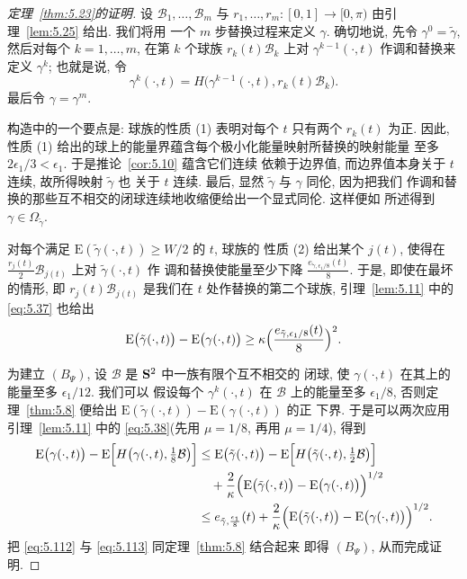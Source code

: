 \begin{proof}[定理~\ref{thm:5.23}的证明]
设 $\mathcal{B}_1,\dots,\mathcal{B}_m$ 与
$r_1,\dots,r_m:[0,1]\to[0,\pi)$ 由引理~\ref{lem:5.25} 给出. 我们将用
一个 $m$ 步替换过程来定义 $\gamma$. 确切地说, 先令
$\gamma^0=\tilde{\gamma}$, 然后对每个 $k=1,\dots,m$, 在第 $k$ 个球族
$r_k(t)\mathcal{B}_k$ 上对 $\gamma^{k-1}(\cdot,t)$ 作调和替换来定义
$\gamma^k$; 也就是说, 令
\begin{equation}
\gamma^k(\cdot,t)=H\bigl(\gamma^{k-1}(\cdot,t),r_k(t)\mathcal{B}_k\bigr).
\label{eq:5.111}
\end{equation}
最后令 $\gamma=\gamma^m$.

构造中的一个要点是: 球族的性质 (1) 表明对每个 $t$ 只有两个 $r_k(t)$ 为正.
因此, 性质 (1) 给出的球上的能量界蕴含每个极小化能量映射所替换的映射能量
至多 $2\epsilon_1/3<\epsilon_1$. 于是推论~\ref{cor:5.10} 蕴含它们连续
依赖于边界值, 而边界值本身关于 $t$ 连续, 故所得映射 $\tilde{\gamma}$ 也
关于 $t$ 连续. 最后, 显然 $\tilde{\gamma}$ 与 $\gamma$ 同伦, 因为把我们
作调和替换的那些互不相交的闭球连续地收缩便给出一个显式同伦. 这样便如
所述得到 $\gamma\in\Omega_{\tilde{\gamma}}$.

对每个满足 $\mathrm{E}(\tilde{\gamma}(\cdot,t))\geq W/2$ 的 $t$, 球族的
性质 (2) 给出某个 $j(t)$, 使得在
$\frac{r_j(t)}2\mathcal{B}_{j(t)}$ 上对 $\tilde{\gamma}(\cdot,t)$ 作
调和替换使能量至少下降
$\frac{e_{\tilde{\gamma},\epsilon_1/8}(t)}{8}$. 于是, 即使在最坏的情形,
即 $r_j(t)\mathcal{B}_{j(t)}$ 是我们在 $t$ 处作替换的第二个球族,
引理~\ref{lem:5.11} 中的 \eqref{eq:5.37} 也给出
\begin{equation}
\mathrm{E}\bigl(\tilde{\gamma}(\cdot,t)\bigr)
-\mathrm{E}\bigl(\gamma(\cdot,t)\bigr)
\geq\kappa\Bigl(\frac{e_{\tilde{\gamma},\epsilon_1/8}(t)}{8}\Bigr)^2.
\label{eq:5.112}
\end{equation}

为建立 $(B_\Psi)$, 设 $\mathcal{B}$ 是 $\mathbf{S}^2$ 中一族有限个互不相交的
闭球, 使 $\gamma(\cdot,t)$ 在其上的能量至多 $\epsilon_1/12$. 我们可以
假设每个 $\gamma^k(\cdot,t)$ 在 $\mathcal{B}$ 上的能量至多 $\epsilon_1/8$,
否则定理~\ref{thm:5.8} 便给出
$\mathrm{E}(\tilde{\gamma}(\cdot,t))-\mathrm{E}(\gamma(\cdot,t))$ 的正
下界. 于是可以两次应用引理~\ref{lem:5.11} 中的 \eqref{eq:5.38}(先用
$\mu=1/8$, 再用 $\mu=1/4$), 得到
\begin{equation}
\begin{aligned}
\mathrm{E}\bigl(\gamma(\cdot,t)\bigr)
-\mathrm{E}\Bigl[H\bigl(\gamma(\cdot,t),\tfrac18\mathcal{B}\bigr)\Bigr]
&\leq\mathrm{E}\bigl(\tilde{\gamma}(\cdot,t)\bigr)
-\mathrm{E}\Bigl[H\bigl(\tilde{\gamma}(\cdot,t),\tfrac12\mathcal{B}\bigr)\Bigr]\\
&\quad+\frac{2}{\kappa}\Bigl(\mathrm{E}\bigl(\tilde{\gamma}(\cdot,t)\bigr)
-\mathrm{E}\bigl(\gamma(\cdot,t)\bigr)\Bigr)^{1/2}\\
&\leq e_{\tilde{\gamma},\frac{\epsilon_1}{8}}(t)
+\frac{2}{\kappa}\Bigl(\mathrm{E}\bigl(\tilde{\gamma}(\cdot,t)\bigr)
-\mathrm{E}\bigl(\gamma(\cdot,t)\bigr)\Bigr)^{1/2}.
\end{aligned}
\label{eq:5.113}
\end{equation}
把 \eqref{eq:5.112} 与 \eqref{eq:5.113} 同定理~\ref{thm:5.8} 结合起来
即得 $(B_\Psi)$, 从而完成证明.
\end{proof}


